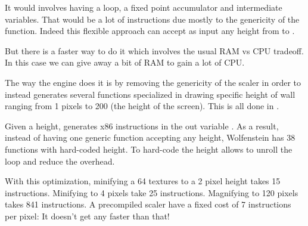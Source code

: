 \par
\begin{minipage}{\textwidth}

\end{minipage}

\par
It would involves having a loop, a fixed point accumulator and intermediate variables. That would be a lot of instructions due mostly to the genericity of the function. Indeed this flexible approach can accept as input any height from  to .\\
\par
 But there is a faster way to do it which involves the usual RAM vs CPU tradeoff. In this case we can give away a bit of RAM to gain a lot of CPU.\\
 \par 
 The way the engine does it is by removing the genericity of the scaler in order to instead generates several functions specialized in drawing specific height of wall ranging from 1 pixels to 200 (the height of the screen). This is all done in .\\
\par
\begin{minipage}{\textwidth}

\end{minipage}
\par
Given a height,  generates x86 instructions in the out variable . As a result, instead of having one generic function accepting any height,  Wolfenstein has 38 functions with hard-coded height. To hard-code the height allows to unroll the loop and reduce the overhead.\\
\par
With this optimization, minifying a 64 textures to a 2 pixel height takes 15 instructions. Minifying to 4 pixels take 25 instructions. Magnifying to 120 pixels takes 841 instructions. A precompiled scaler have a fixed cost of 7 instructions per pixel: It doesn't get any faster than that!\\

